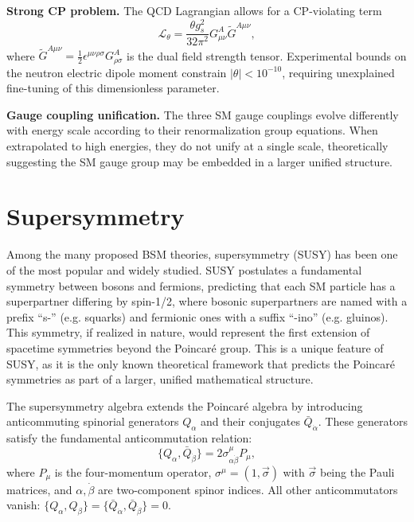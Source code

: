 \textbf{Strong CP problem.} The QCD Lagrangian allows for a CP-violating term
\begin{equation}
\mathcal{L}_{\theta} = \frac{\theta g_s^2}{32\pi^2} G^A_{\mu\nu} \tilde{G}^{A\mu\nu},
\end{equation}
where $\tilde{G}^{A\mu\nu} = \frac{1}{2}\epsilon^{\mu\nu\rho\sigma}G^A_{\rho\sigma}$ is the dual field strength tensor. Experimental bounds on the neutron electric dipole moment constrain $|\theta| < 10^{-10}$, requiring unexplained fine-tuning of this dimensionless parameter.

\textbf{Gauge coupling unification.} The three SM gauge couplings evolve differently with energy scale according to their renormalization group equations. When extrapolated to high energies, they do not unify at a single scale, theoretically suggesting the SM gauge group may be embedded in a larger unified structure.

\section{Supersymmetry}

Among the many proposed BSM theories, supersymmetry (SUSY) has been one of the most popular and widely studied. SUSY postulates a fundamental symmetry between bosons and fermions, predicting that each SM particle has a superpartner differing by spin-1/2, where bosonic superpartners are named with a prefix ``s-'' (e.g. squarks) and fermionic ones with a suffix ``-ino'' (e.g. gluinos). This symmetry, if realized in nature, would represent the first extension of spacetime symmetries beyond the Poincaré group. This is a unique feature of SUSY, as it is the only known theoretical framework that predicts the Poincaré symmetries as part of a larger, unified mathematical structure.

The supersymmetry algebra extends the Poincaré algebra by introducing anticommuting spinorial generators $Q_\alpha$ and their conjugates $\bar{Q}_{\dot{\alpha}}$. These generators satisfy the fundamental anticommutation relation:
\begin{equation}
\{Q_\alpha, \bar{Q}_{\dot{\beta}}\} = 2\sigma^\mu_{\alpha\dot{\beta}} P_\mu,
\end{equation}
where $P_\mu$ is the four-momentum operator, $\sigma^\mu = (1, \vec{\sigma})$ with $\vec{\sigma}$ being the Pauli matrices, and $\alpha, \dot{\beta}$ are two-component spinor indices. All other anticommutators vanish: $\{Q_\alpha, Q_\beta\} = \{\bar{Q}_{\dot{\alpha}}, \bar{Q}_{\dot{\beta}}\} = 0$.



